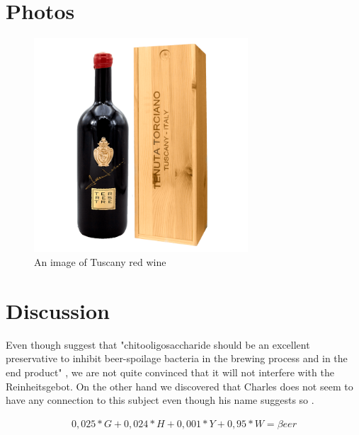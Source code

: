\documentclass{article}
\begin{document}
\section{Photos}
\begin{figure}[htp]
    \centering
        \includegraphics[width=8cm]{redwine_tuscany.png}
    \caption{An image of Tuscany red wine }
    \label{fig:1}
\end{figure}

\newpage
\section{Discussion}
Even though \cite{Zhao2015} suggest that "chitooligosaccharide should be an excellent preservative to inhibit beer-spoilage bacteria in the brewing process and in the end product" , we are not quite convinced that it will not interfere with the Reinheitsgebot. On the other hand we discovered that Charles \cite{Beer2003} does not seem to have any connection to this subject even though his name suggests so .

\par
\begin{align}
0,025*G + 0,024*H + 0,001*Y + 0,95*W = \beta eer
\end{align}






\printbibliography
\end{document}
